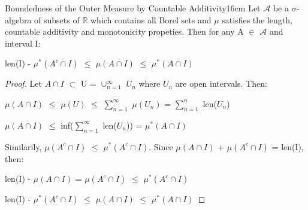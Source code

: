     \vspace{0.5cm}



    \begin{wtheorem}{Boundedness of the Outer Measure by Countable Additivity}{16cm}
        Let $\mathcal{A}$ be a $\sigma$-algebra of subsets of $\mathbb{R}$
        which contains all Borel sets and $\mu$ satisfies the length,
        countable additivity and monotonicity propeties.
        Then for any A $\in$ $\mathcal{A}$ and interval I:

        \hspace{0.5cm}
        len(I) - $\mu^*(A^c \cap I)$
        $\leq$ $\mu(A \cap I)$
        $\leq$ $\mu^*(A \cap I)$
    \end{wtheorem}

    \begin{proof}
        Let $A \cap I$ $\subset$ U = $\cup_{n=1}^{\infty}$ $U_n$
        where $U_n$ are open intervals. Then:
        
        \hspace{0.5cm}
        $\mu(A \cap I)$
        $\leq$ $\mu(U)$
        $\leq$ $\sum_{n=1}^{\infty}$ $\mu(U_n)$
        = $\sum_{n=1}^n$ len($U_n$)
        
        \hspace{0.5cm}
        $\mu(A \cap I)$
        $\leq$ inf($\sum_{n=1}^{\infty}$ len($U_n$))
        = $\mu^*(A \cap I)$

        Similarily, $\mu(A^c \cap I)$ $\leq$ $\mu^*(A^c \cap I)$.
        Since $\mu(A \cap I)$ + $\mu(A^c \cap I)$ = len(I), then:

        \hspace{0.5cm}
        len(I) - $\mu(A \cap I)$
        = $\mu(A^c \cap I)$
        $\leq$ $\mu^*(A^c \cap I)$
        
        \hspace{0.5cm}
        len(I) - $\mu^*(A^c \cap I)$
        $\leq$ $\mu(A \cap I)$
        $\leq$ $\mu^*(A \cap I)$
    \end{proof}

    \vspace{0.5cm}



